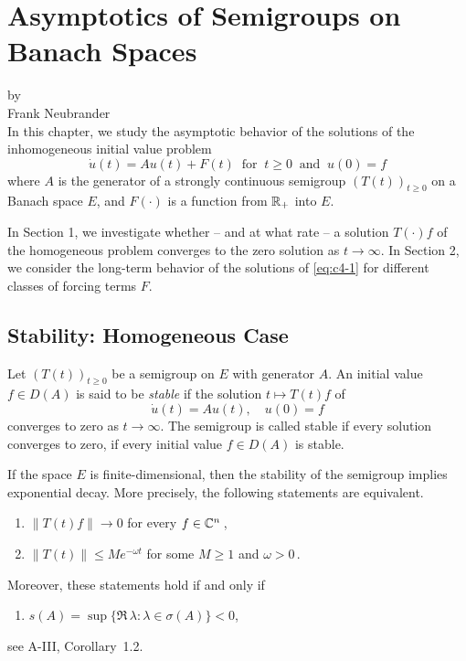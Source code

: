 \chapter{Asymptotics of Semigroups on Banach Spaces}\label{chap:a4}
{\Large
\vspace*{-.75cm}
by \\[.25em]
Frank Neubrander
\vspace{.75cm}
\\
}
In this chapter, we study the asymptotic behavior of the solutions of the inhomogeneous initial value problem
\begin{equation}\label{eq:c4-1}
\dot{u}(t) = Au(t) + F(t) \ \text{ for } \  t \geq 0 \ \text{ and } \  
 u(0) = f \tag{*}
\end{equation}
where $ A $ is the generator of a strongly continuous semigroup $ (T(t))_{t \geq 0} $ on a Banach space $ E $, and $ F(\cdot) $ is a function from $ \mathbb{R}_{+} $ into $ E $.

In Section 1, we investigate whether -- and at what rate -- a solution $ T(\cdot)f $ of the homogeneous problem converges to the zero solution as $ t \to \infty $. 
In Section 2, we consider the long-term behavior of the solutions of \eqref{eq:c4-1} for different classes of forcing terms $ F $.
\section{Stability: Homogeneous Case}\label{sec:c4-1}
Let $ (T(t))_{t \geq 0} $ be a semigroup on $ E $ with generator $ A $.
An initial value $ f \in D(A) $ is said to be \emph{stable} if the solution $ t \mapsto T(t)f $ of
\begin{equation}\label{eq:c4-2}
\dot{u}(t) = Au(t), \quad u(0) = f \tag{ACP}
\end{equation}
converges to zero as $ t \to \infty $. 
The semigroup is called stable if every solution converges to zero, \ie if every initial value $ f \in D(A) $ is stable.

If the space $ E $ is finite-dimensional, then the stability of the semigroup implies exponential decay. 
More precisely, the following statements are equivalent.
\begin{enumerate}[\upshape (a)]
\item 
$ \|T(t)f\| \to 0 $ for every $ f \in \mathbb{C}^{n} $\,,

\item 
$ \|T(t)\| \leq Me^{-\omega t} $ for some $M \geq 1$ and  $\omega > 0 $\,.
\end{enumerate}
Moreover, these statements hold if and only if
\begin{enumerate}
\item 
$s(A) = \sup\{\Re\,\lambda \colon \lambda \in \sigma(A)\} < 0$, 
\end{enumerate}
see A-III, Corollary~1.2.

